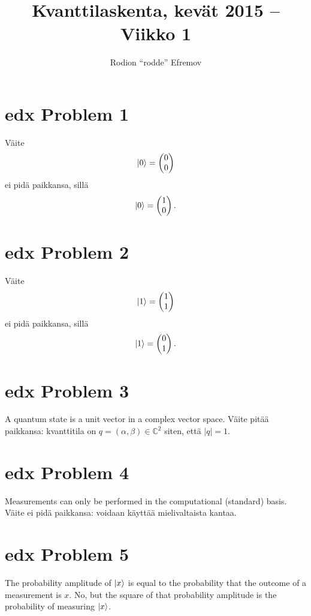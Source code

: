 \documentclass[10pt]{article}
\title{Kvanttilaskenta, kevät 2015 -- Viikko 1}
\author{Rodion ``rodde'' Efremov}
\begin{document}
 \maketitle
 
 \section*{edx Problem 1}
 Väite
 \[
 \ket{0} = \begin{pmatrix}
 0 \\
 0
 \end{pmatrix}
 \]
 ei pidä paikkansa, sillä
 \[
 \ket{0} = \begin{pmatrix}
 1 \\
 0
 \end{pmatrix}.
 \]
 
 \section*{edx Problem 2}
 Väite
 \[
 \ket{1} = \begin{pmatrix}
 1 \\
 1
 \end{pmatrix}
 \]
 ei pidä paikkansa, sillä
 \[
 \ket{1} = \begin{pmatrix}
 0 \\
 1
 \end{pmatrix}.
 \]
 
 \section*{edx Problem 3}
 \color{blue} A quantum state is a unit vector in a complex vector space.
 \color{black} Väite pitää paikkansa: kvanttitila on $q = (\alpha, \beta) \in \mathbb{C}^2$ siten, että $|q| = 1$.
 
 \section*{edx Problem 4}
 \color{blue} Measurements can only be performed in the computational (standard) basis.
 \color{black} Väite ei pidä paikkansa: voidaan käyttää mielivaltaista kantaa.
 
 \section*{edx Problem 5}
 \color{blue} The probability amplitude of $\ket{x}$ is equal to the probability that the outcome of a measurement is $x$.
 \color{black} No, but the square of that probability amplitude is the probability of measuring $\ket{x}$.
 
\end{document}
